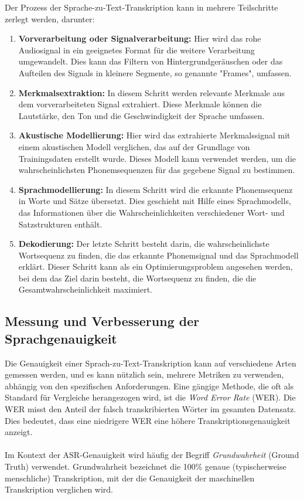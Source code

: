 \documentclass[12pt,a4paper]{article}
\begin{document}
Der Prozess der Sprache-zu-Text-Transkription kann in mehrere Teilschritte zerlegt werden, darunter:

\begin{enumerate}
	\item \textbf{Vorverarbeitung oder Signalverarbeitung:} Hier wird das rohe Audiosignal in ein geeignetes Format für die weitere Verarbeitung umgewandelt. Dies kann das Filtern von Hintergrundgeräuschen oder das Aufteilen des Signals in kleinere Segmente, so genannte "Frames", umfassen.
	\item \textbf{Merkmalsextraktion:} In diesem Schritt werden relevante Merkmale aus dem vorverarbeiteten Signal extrahiert. Diese Merkmale können die Lautstärke, den Ton und die Geschwindigkeit der Sprache umfassen. 
	\item \textbf{Akustische Modellierung:} Hier wird das extrahierte Merkmalssignal mit einem akustischen Modell verglichen, das auf der Grundlage von Trainingsdaten erstellt wurde. Dieses Modell kann verwendet werden, um die wahrscheinlichsten Phonemsequenzen für das gegebene Signal zu bestimmen.
	\item \textbf{Sprachmodellierung:} In diesem Schritt wird die erkannte Phonemsequenz in Worte und Sätze übersetzt. Dies geschieht mit Hilfe eines Sprachmodells, das Informationen über die Wahrscheinlichkeiten verschiedener Wort- und Satzstrukturen enthält.
	\item \textbf{Dekodierung:} Der letzte Schritt besteht darin, die wahrscheinlichste Wortsequenz zu finden, die das erkannte Phonemsignal und das Sprachmodell erklärt. Dieser Schritt kann als ein Optimierungsproblem angesehen werden, bei dem das Ziel darin besteht, die Wortsequenz zu finden, die die Gesamtwahrscheinlichkeit maximiert.
\end{enumerate}

\subsection{Messung und Verbesserung der Sprachgenauigkeit}

Die Genauigkeit einer Sprach-zu-Text-Transkription kann auf verschiedene Arten gemessen werden, und es kann nützlich sein, mehrere Metriken zu verwenden, abhängig von den spezifischen Anforderungen. Eine gängige Methode, die oft als Standard für Vergleiche herangezogen wird, ist die \textit{Word Error Rate} (WER). Die WER misst den Anteil der falsch transkribierten Wörter im gesamten Datensatz. Dies bedeutet, dass eine niedrigere WER eine höhere Transkriptionsgenauigkeit anzeigt.
\\ \\
Im Kontext der ASR-Genauigkeit wird häufig der Begriff \textit{Grundwahrheit} (Ground Truth) verwendet. Grundwahrheit bezeichnet die 100\% genaue (typischerweise menschliche) Transkription, mit der die Genauigkeit der maschinellen Transkription verglichen wird.
\end{document}
